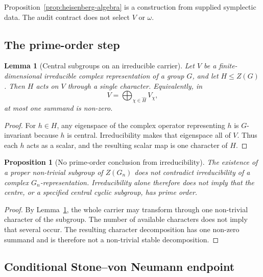 \documentclass[11pt,a4paper]{article}
\newtheorem{lemma}[theorem]{Lemma}
\newtheorem{proposition}[theorem]{Proposition}
\begin{document}
    Proposition~\ref{prop:heisenberg-algebra} is a construction from supplied
    symplectic data.
    The audit contract does not select $V$ or $\omega$.

  \subsection{The prime-order step}

    \begin{lemma}[Central subgroups on an irreducible carrier]
      \label{lem:central-character}
      Let $V$ be a finite-dimensional irreducible complex representation of a
      group $G$, and let $H\leq Z(G)$.
      Then $H$ acts on $V$ through a single character.
      Equivalently, in
      \[
        V=\bigoplus_{\chi\in\widehat H}V_\chi,
      \]
      at most one summand is non-zero.
    \end{lemma}

    \begin{proof}
      For $h\in H$, any eigenspace of the complex operator representing $h$ is
      $G$-invariant because $h$ is central.
      Irreducibility makes that eigenspace all of $V$.
      Thus each $h$ acts as a scalar, and the resulting scalar map is one
      character of $H$.
    \end{proof}

    \begin{proposition}[No prime-order conclusion from irreducibility]
      \label{prop:prime}
      The existence of a proper non-trivial subgroup of $Z(G_n)$ does not
      contradict irreducibility of a complex $G_n$-representation.
      Irreducibility alone therefore does not imply that the centre, or a
      specified central cyclic subgroup, has prime order.
    \end{proposition}

    \begin{proof}
      By Lemma~\ref{lem:central-character}, the whole carrier may transform
      through one non-trivial character of the subgroup.
      The number of available characters does not imply that several occur.
      The resulting character decomposition has one non-zero summand and is
      therefore not a non-trivial stable decomposition.
    \end{proof}

  \subsection{Conditional Stone--von Neumann endpoint}
\end{document}
